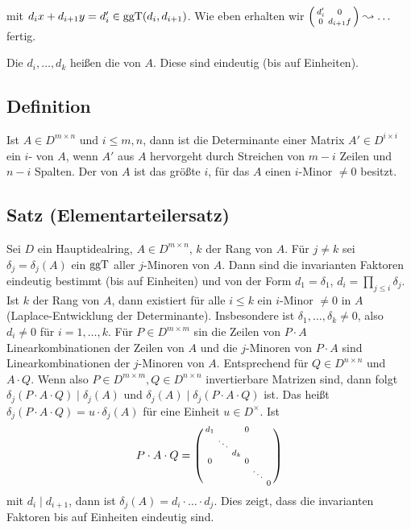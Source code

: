 mit $d_i x + d_{i+1} y = d_i' \in \operatorname{ggT}(d_i, d_{i+1})$. Wie eben erhalten wir $\begin{psmallmatrix}
	d_i' & 0 \\
	0 & d_{i+1} f
\end{psmallmatrix} \leadsto \ldots $ fertig. \bewende

Die $d_i, \ldots , d_k$ heißen die  von $A$. Diese sind eindeutig (bis auf Einheiten). 

\subsection[Definition: $i$-Minoren und Rang]{Definition} %
\label{sub:244}
Ist $A \in D^{m \times n}$ und $i \le m,n$, dann ist die Determinante einer Matrix $A' \in D^{i \times i}$ ein $i$- von $A$, wenn $A'$ aus $A$ hervorgeht
durch Streichen von $m-i$ Zeilen und $n-i$ Spalten. Der  von $A$ ist das größte $i$, für das $A$ einen $i$-Minor $\not= 0$ besitzt.

\subsection{Satz (Elementarteilersatz)} %
\label{sub:245}
Sei $D$ ein Hauptidealring, $A \in D^{m\times n}$, $k$ der Rang von $A$. Für $j \ne k$ sei $\delta_j = \delta_j(A)$ ein $\operatorname{ggT}$ aller $j$-Minoren von $A$. Dann sind die
invarianten Faktoren eindeutig bestimmt (bis auf Einheiten) und von der Form $d_1 = \delta_1$, $d_i = \prod_{j \le i} \delta_j$.
Ist $k$ der Rang von $A$, dann existiert für alle $i \le k$ ein $i$-Minor $\not= 0$ in $A$ (Laplace-Entwicklung der Determinante). Insbesondere ist 
$\delta_1, \ldots , \delta _k \not= 0$, also $d_i \not= 0$ für $i=1, \ldots ,k$. Für $P \in D^{m \times m}$ sin die Zeilen von $P \cdot A$ Linearkombinationen der 
Zeilen von $A$ und die $j$-Minoren von $P \cdot A$ sind Linearkombinationen der $j$-Minoren von $A$. Entsprechend für $Q \in D^{n \times n}$ und $A \cdot Q$. Wenn also
$P \in D^{m \times m}, Q \in D^{n \times n}$ invertierbare Matrizen sind, dann folgt $\delta_j (P \cdot A \cdot Q) \mid \delta_j (A)$ und 
$\delta_j(A) \mid \delta_j (P \cdot A \cdot Q)$ ist. Das heißt $\delta_j (P \cdot A \cdot Q) = u \cdot \delta_j(A)$ für eine Einheit $u \in D^\times$. Ist 
\[
	P \cdot A \cdot Q = \begin{psmallmatrix}
		d_1 & & & 0 & & \\
		& \ddots & & & & \\
		& & d_k & & & \\
		0 & & & 0 & & \\
		& & & & \ddots & \\
		& & & & & 0
	\end{psmallmatrix}
\] 
mit $d_i \mid d_{i+1}$, dann ist $\delta_j(A) = d_i \cdot \ldots \cdot d_j$. Dies zeigt, dass die invarianten Faktoren bis auf Einheiten eindeutig sind.

